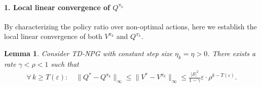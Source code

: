 \documentclass[10pt]{article}
\newcommand{\calS}{\mathcal{S}}
\theoremstyle{plain}
\newtheorem{lemma}[theorem]{Lemma}
\theoremstyle{definition}
\begin{document}
\vspace{2em}

\paragraph{1. Local linear convergence of $Q^{\pi_k}$}
By characterizing the policy ratio over non-optimal actions, here we  establish the local linear convergence of both $V^{\pi_k}$ and $Q^{\pi_k}$.
\begin{lemma}
    Consider TD-NPG with constant step size $\eta_k = \eta > 0$. There exists a rate $\gamma < \rho < 1$ such that
    \begin{align*}
        \forall\, k\geq T(\varepsilon): \quad \| Q^* - Q^{\pi_k} \|_\infty \leq \| V^* - V^{\pi_k} \|_\infty \leq \frac{|\calS|^2}{1-\gamma} \varepsilon \cdot \rho^{k-T(\varepsilon)}.
    \end{align*}
    \label{lem:local-linear-convergence-of-Q-pi-TD-NPG}
\end{lemma}
\end{document}
